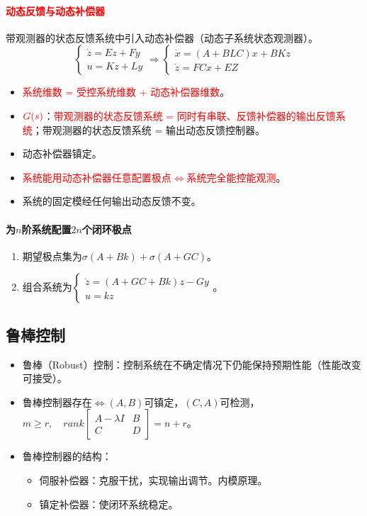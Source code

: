 \documentclass[
12pt, %
a4paper, 
oneside, %
]{scrartcl}
\begin{document}
\paragraph{\textcolor{red}{动态反馈与动态补偿器}}
带观测器的状态反馈系统中引入动态补偿器（动态子系统状态观测器）。
$$ \begin{cases} \dot{z} = E z + F y \\ u = K z + L y \end{cases} \Rightarrow \begin{cases} \dot{x} = (A + B L C)x + B K z \\ \dot{z} = F C x + E Z \end{cases} $$
\begin{itemize}
\item \textcolor{red}{系统维数 = 受控系统维数 + 动态补偿器维数}。
\item $ \textcolor{red}{G(s)} $：\textcolor{red}{带观测器的状态反馈系统 = 同时有串联、反馈补偿器的输出反馈系统}；带观测器的状态反馈系统 = 输出动态反馈控制器。
\item 动态补偿器镇定。
\item \textcolor{red}{系统能用动态补偿器任意配置极点$ \Leftrightarrow $系统完全能控能观测}。
\item 系统的固定模经任何输出动态反馈不变。
\end{itemize}
\paragraph{为$ n $阶系统配置$ 2n $个闭环极点}
\begin{enumerate}
\item 期望极点集为$ \sigma(A + B k) + \sigma(A + G C) $。
\item 组合系统为$ \begin{cases} \dot{z} = (A + G C + B k)z - G y \\ u = k z \end{cases} $。
\end{enumerate}
\subsection[鲁棒控制]{鲁棒控制}
\begin{itemize}
\item 鲁棒（Robust）控制：控制系统在不确定情况下仍能保持预期性能（性能改变可接受）。
\item 鲁棒控制器存在$ \Leftrightarrow $$ (A, B) $可镇定，$ (C, A) $可检测，$ m \geq r, \quad rank \begin{bmatrix} A - \lambda I & B \\ C & D \end{bmatrix} = n + r $。
\item 鲁棒控制器的结构：
\begin{itemize}
\item 伺服补偿器：克服干扰，实现输出调节。内模原理。
\item 镇定补偿器：使闭环系统稳定。
\end{itemize}
\end{itemize}
\newpage
\end{document}
